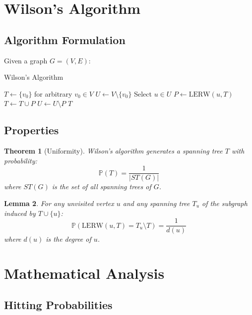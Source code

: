 \documentclass[twocolumn,10pt]{article}
\newtheorem{theorem}{Theorem}
\newtheorem{lemma}[theorem]{Lemma}
\begin{document}
\section{Wilson's Algorithm}

\subsection{Algorithm Formulation}

Given a graph $G=(V,E)$:

\begin{algorithm}[H]
\caption{Wilson's Algorithm}
\begin{algorithmic}[1]
\State $T \gets \{v_0\}$ for arbitrary $v_0 \in V$
\State $U \gets V \setminus \{v_0\}$ 
    \State Select $u \in U$
    \State $P \gets \text{LERW}(u, T)$ 
    \State $T \gets T \cup P$
    \State $U \gets U \setminus P$
\EndWhile
\State \Return $T$ 
\end{algorithmic}
\end{algorithm}

\subsection{Properties}

\begin{theorem}[Uniformity]
Wilson's algorithm generates a spanning tree $T$ with probability:
\begin{equation}
\mathbb{P}(T) = \frac{1}{|ST(G)|}
\end{equation}
where $ST(G)$ is the set of all spanning trees of $G$.
\end{theorem}

\begin{lemma}
For any unvisited vertex $u$ and any spanning tree $T_u$ of the subgraph induced by $T \cup \{u\}$:
\begin{equation}
\mathbb{P}(\text{LERW}(u, T) = T_u \setminus T) = \frac{1}{d(u)}
\end{equation}
where $d(u)$ is the degree of $u$.
\end{lemma}

\section{Mathematical Analysis}

\subsection{Hitting Probabilities}
\end{document}

